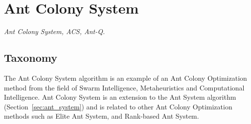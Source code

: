 

\section{Ant Colony System} 
\label{sec:ant_colony_system}

\emph{Ant Colony System, ACS, Ant-Q.}

\subsection{Taxonomy}
The Ant Colony System algorithm is an example of an Ant Colony Optimization method from the field of Swarm Intelligence, Metaheuristics and Computational Intelligence.
Ant Colony System is an extension to the Ant System algorithm (Section~\ref{sec:ant_system}) and is related to other Ant Colony Optimization methods such as Elite Ant System, and Rank-based Ant System.

